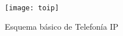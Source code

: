 	\begin{figure}[h]
		
		\texttt{[image: toip]}
		
		\caption{Esquema básico de Telefonía IP}
		
		\centering
		
		\label{fig:toip}
	\end{figure}

	
	
	

